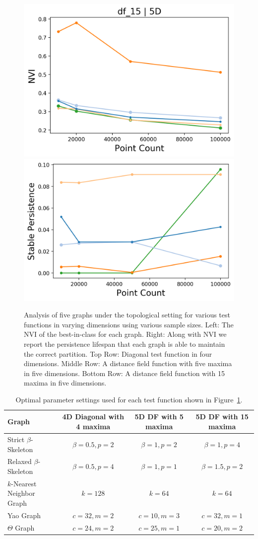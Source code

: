 \begin{figure}[htbp]
    \includegraphics[width=0.48\linewidth]{figs/chap7/df_15_5D_nvi.png}
    \includegraphics[width=0.48\linewidth]{figs/chap7/df_15_5D.png}
    \caption[Analysis of graphs for topological stability]{Analysis of five graphs under the topological setting for various test functions in varying dimensions using various sample sizes.
    Left: The NVI of the best-in-class for each graph.
    Right: Along with NVI we report the persistence lifespan that each graph is able to maintain the correct partition.
    Top Row: Diagonal test function in four dimensions.
    Middle Row: A distance field function with five maxima in five dimensions.
    Bottom Row: A distance field function with 15 maxima in five dimensions.}
    \label{fig:graph_topo}
\end{figure}

\begin{table}[htbp]
    \scriptsize
    \centering
    \begin{tabular}{| l | c | c | c |}
    \hline
    \textbf{Graph}  & \textbf{4D Diagonal with 4 maxima} & \textbf{5D DF with 5 maxima} & \textbf{5D DF with 15 maxima} \\
    \hline
    Strict $\beta$-Skeleton & $\beta=0.5, p=2$ & $\beta=1, p=2$  & $\beta=1, p=4$ \\
    Relaxed $\beta$-Skeleton & $\beta=0.5, p=4$ & $\beta=1, p=1$  & $\beta=1.5, p=2$ \\
    $k$-Nearest Neighbor Graph & $k=128$ & $k=64$  & $k=64$ \\
    Yao Graph & $c=32, m=2$ & $c=10, m=3$  & $c=32, m=1$ \\
    $\Theta$ Graph & $c=24, m=2$ & $c=25, m=1$  & $c=20, m=2$ \\
    \hline
    \end{tabular}
    \caption[Optimal graph parameters used in Figure~\ref{fig:graph_topo}]{Optimal parameter settings used for each test function shown in Figure~\ref{fig:graph_topo}.}
    \label{tab:optimal_settings}
\end{table}


